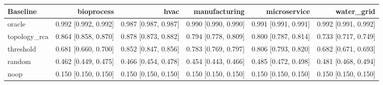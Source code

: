 \begin{tabular}{lrrrrr}
\toprule
Baseline & bioprocess & hvac & manufacturing & microservice & water\_grid \\
\midrule
oracle & 0.992 [0.992, 0.992] & 0.987 [0.987, 0.987] & 0.990 [0.990, 0.990] & 0.991 [0.991, 0.991] & 0.992 [0.991, 0.992] \\
topology\_rca & 0.864 [0.858, 0.870] & 0.878 [0.873, 0.882] & 0.794 [0.778, 0.809] & 0.800 [0.787, 0.814] & 0.733 [0.717, 0.749] \\
threshold & 0.681 [0.660, 0.700] & 0.852 [0.847, 0.856] & 0.783 [0.769, 0.797] & 0.806 [0.793, 0.820] & 0.682 [0.671, 0.693] \\
random & 0.462 [0.449, 0.475] & 0.466 [0.454, 0.478] & 0.454 [0.443, 0.466] & 0.485 [0.472, 0.498] & 0.481 [0.468, 0.494] \\
noop & 0.150 [0.150, 0.150] & 0.150 [0.150, 0.150] & 0.150 [0.150, 0.150] & 0.150 [0.150, 0.150] & 0.150 [0.150, 0.150] \\
\bottomrule
\end{tabular}
